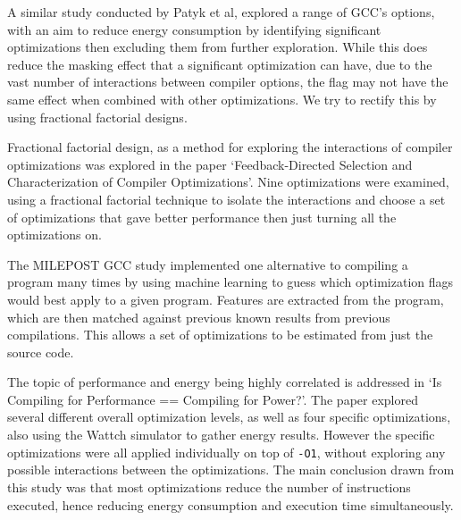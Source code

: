 \documentclass[twocolumn]{article}
\begin{document}

A similar study conducted by Patyk et al\cite{EnergyReductionCompilerOptions}, explored a range of GCC's options, with an aim to reduce energy consumption by identifying significant optimizations then excluding them from further exploration. While this does reduce the masking effect that a significant optimization can have, due to the vast number of interactions between compiler options, the flag may not have the same effect when combined with other optimizations. We try to rectify this by using fractional factorial designs.

Fractional factorial design, as a method for exploring the interactions of compiler optimizations was explored in the paper `Feedback-Directed Selection and Characterization of Compiler Optimizations'\cite{IntelPaper}. Nine optimizations were examined, using a fractional factorial technique to isolate the interactions and choose a set of optimizations that gave better performance then just turning all the optimizations on.

The MILEPOST GCC study implemented one alternative to compiling a program many times by using machine learning to guess which optimization flags would best apply to a given program. Features are extracted from the program, which are then matched against previous known results from previous compilations. This allows a set of optimizations to be estimated from just the source code.

The topic of performance and energy being highly correlated is addressed in `Is Compiling for Performance == Compiling for Power?'\cite{CompilingForPerformancePower}. The paper explored several different overall optimization levels, as well as four specific optimizations, also using the Wattch simulator to gather energy results. However the specific optimizations were all applied individually on top of \texttt{-O1}, without exploring any possible interactions between the optimizations. The main conclusion drawn from this study was that most optimizations reduce the number of instructions executed, hence reducing energy consumption and execution time simultaneously.
\end{document}
